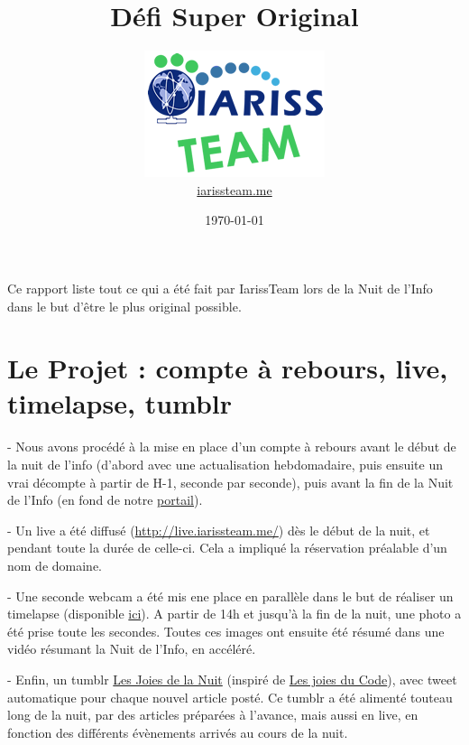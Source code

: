 \documentclass[12pt, a4paper]{article}
\title{Défi Super Original}
\newcommand{\espace}{\vspace{.8cm}}
\begin{document}
\author{\includegraphics{../_img/iariss_team.png} \\ {\sffamily \href{http://iarissteam.me}{iarissteam.me}}}
\date{\today}

\maketitle{}

{\sffamily Ce rapport liste tout ce qui a été fait par IarissTeam lors de la Nuit de l'Info dans le but d'être le plus original possible.} 

\espace{}
\section{Le Projet : compte à rebours, live, timelapse, tumblr}
 
- Nous avons procédé à la mise en place d'un compte à rebours avant le début de la nuit de l'info (d'abord avec une actualisation hebdomadaire, puis ensuite un vrai décompte à partir de H-1, seconde par seconde), puis avant la fin de la Nuit de l'Info (en fond de notre \href{http://iarissteam.me/}{portail}).

- Un live a été diffusé (\href{http://live.iarissteam.me/}{http://live.iarissteam.me/}) dès le début de la nuit, et pendant toute la durée de celle-ci. Cela a impliqué la réservation préalable d'un nom de domaine.

- Une seconde webcam a été mis ene place en parallèle dans le but de réaliser un timelapse (disponible \href{http://timelapse.iarissteam.me}{ici}). A partir de 14h et jusqu'à la fin de la nuit, une photo a été prise toute les secondes. Toutes ces images ont ensuite été résumé dans une vidéo résumant la Nuit de l'Info, en accéléré.

- Enfin, un tumblr \href{http://lesjoiesdelanuit.tumblr.com/}{Les Joies de la Nuit} (inspiré de \href{http://lesjoiesducode.tumblr.com/}{Les joies du Code}), avec tweet automatique pour chaque nouvel article posté. Ce tumblr a été alimenté touteau long de la nuit, par des articles préparées à l'avance, mais aussi en \og{}live\fg{}, en fonction des différents évènements arrivés au cours de la nuit.
\end{document}
